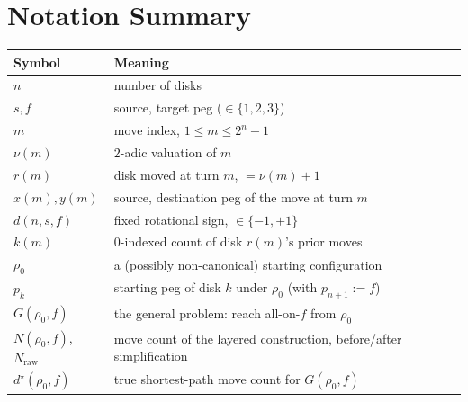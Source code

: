 \documentclass[11pt]{article}
\begin{document}
\appendix
\section{Notation Summary}

\begin{center}
\begin{tabular}{ll}
\toprule
Symbol & Meaning \\
\midrule
$n$ & number of disks \\
$s, f$ & source, target peg ($\in\{1,2,3\}$) \\
$m$ & move index, $1 \le m \le 2^n - 1$ \\
$\nu(m)$ & $2$-adic valuation of $m$ \\
$r(m)$ & disk moved at turn $m$, $=\nu(m)+1$ \\
$x(m), y(m)$ & source, destination peg of the move at turn $m$ \\
$d(n,s,f)$ & fixed rotational sign, $\in \{-1,+1\}$ \\
$k(m)$ & $0$-indexed count of disk $r(m)$'s prior moves \\
$\rho_0$ & a (possibly non-canonical) starting configuration \\
$p_k$ & starting peg of disk $k$ under $\rho_0$ (with $p_{n+1}:=f$) \\
$G(\rho_0,f)$ & the general problem: reach all-on-$f$ from $\rho_0$ \\
$N(\rho_0,f)$, $N_{\mathrm{raw}}$ & move count of the layered construction, before/after simplification \\
$d^\star(\rho_0,f)$ & true shortest-path move count for $G(\rho_0,f)$ \\
\bottomrule
\end{tabular}
\end{center}
\end{document}
